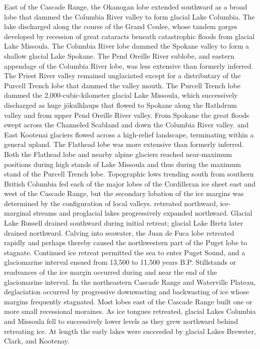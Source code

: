 	\ddd East of the Cascade Range, the Okanogan lobe extended southward as a broad lobe that dammed the Columbia River valley to form glacial Lake Columbia. The lake discharged along the course of the Grand Coulee, whose tandem gorges developed by recession of great cataracts beneath catastrophic floods from glacial Lake Missoula.
	\ddd The Columbia River lobe dammed the Spokane valley to form a shallow glacial Lake Spokane. The Pend Oreille River sublobe, and eastern appendage of the Columbia River lobe, was less extensive than formerly inferred. The Priest River valley remained unglaciated except for a distributary of the Purcell Trench lobe that dammed the valley mouth.
	\ddd The Purcell Trench lobe dammed the 2,000-cubic-kilometer glacial Lake Missoula, which successively discharged as huge jökulhlaups that flowed to Spokane along the Rathdrum valley and from upper Pend Oreille River valley. From Spokane the great floods swept across the Channeled Scabland and down the Columbia River valley.
	 and East Kootenai glaciers flowed across a high-relief landscape, terminating within a general upland. The Flathead lobe was more extensive than formerly inferred. Both the Flathead lobe and nearby alpine glaciers reached near-maximum positions during high stands of Lake Missoula and thus during the maximum stand of the Purcell Trench lobe. Topographic lows trending south from southern British Columbia fed each of the major lobes of the Cordilleran ice sheet east and west of the Cascade Range, but the secondary lobation of the ice margins was determined by the configuration of local valleys.
	\ddd {} retreated northward, ice-marginal streams and proglacial lakes progressively expanded northward. Glacial Lake Russell drained southward during initial retreat; glacial Lake Bretz later drained northward. Calving into seawater, the Juan de Fuca lobe retreated rapidly and perhaps thereby caused the northwestern part of the Puget lobe to stagnate. Continued ice retreat permitted the sea to enter Puget Sound, and a glaciomarine interval ensued from 13,500 to 11,500 years B.P. Stillstands or readvances of the ice margin occurred during and near the end of the glaciomarine interval. In the northeastern Cascade Range and Waterville Plateau, deglaciation occurred by progressive downwasting and backwasting of ice whose margins frequently stagnated. Most lobes east of the Cascade Range built one or more small recessional moraines. As ice tongues retreated, glacial Lakes Columbia and Missoula fell to successively lower levels as they grew northward behind retreating ice. At length the early lakes were succeeded by glacial Lakes Brewster, Clark, and Kootenay.
